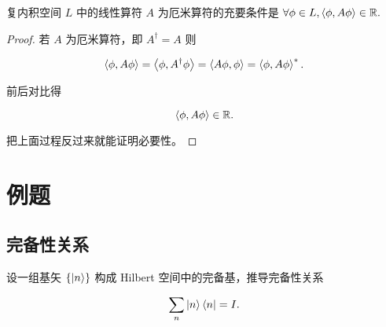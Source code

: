 \begin{theorem}
复内积空间 $L $ 中的线性算符 $A $ 为厄米算符的充要条件是 $\forall \phi\in L, \Braket{\phi , A \phi}\in \mathbb{R} .$
\end{theorem}

\begin{proof}

若 $A $ 为厄米算符，即 $A^\dag=A $ 则

\begin{equation}
\Braket{\phi , A \phi}
=\Braket{\phi , A^\dag \phi}
=\Braket{A \phi , \phi}
=\Braket{\phi , A \phi}^*.
\end{equation}

前后对比得

\begin{equation}
\Braket{\phi , A \phi}\in \mathbb{R}.
\end{equation}

把上面过程反过来就能证明必要性。

\end{proof}

\section{例题}

\subsection{完备性关系}

\begin{example}

设一组基矢 $\left\{\Ket{n } \right\} $ 构成 Hilbert 空间中的完备基，推导完备性关系

\begin{equation}
\sum_n \Ket{n } \Bra{n } = I.
\end{equation}

\end{example}

